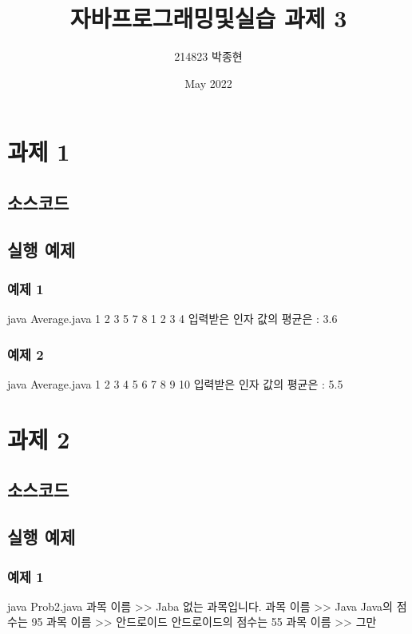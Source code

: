 \documentclass{article}
\title{자바프로그래밍및실습 과제 3}
\author{214823 박종현}
\date{May 2022}
\theoremstyle{nonumberplain}
\begin{document}
\maketitle
\pagebreak



\section{과제 1}
\subsection{소스코드}


\subsection{실행 예제}
\subsubsection{예제 1}
\begin{console}
java Average.java 1 2 3 5 7 8 1 2 3 4
입력받은 인자 값의 평균은 : 3.6
\end{console}
\subsubsection{예제 2}
\begin{console}
java Average.java 1 2 3 4 5 6 7 8 9 10          
입력받은 인자 값의 평균은 : 5.5
\end{console}



\section{과제 2}
\subsection{소스코드}

\subsection{실행 예제}
\subsubsection{예제 1}
\begin{console}
java Prob2.java
과목 이름 >> Jaba
없는 과목입니다.
과목 이름 >> Java
Java의 점수는 95
과목 이름 >> 안드로이드
안드로이드의 점수는 55
과목 이름 >> 그만
\end{console}
\end{document}
